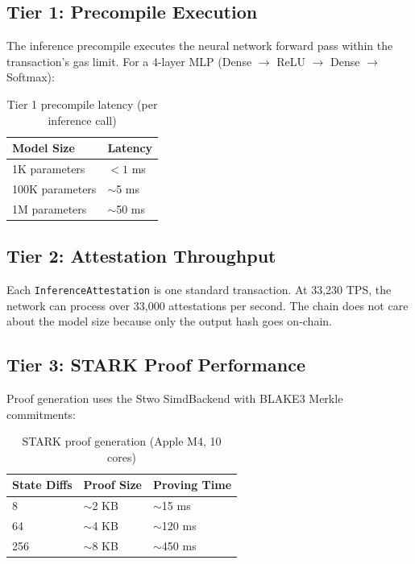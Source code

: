 \documentclass[conference]{IEEEtran}
\begin{document}
\subsection{Tier 1: Precompile Execution}

The inference precompile executes the neural network forward pass within the transaction's gas limit. For a 4-layer MLP (Dense $\rightarrow$ ReLU $\rightarrow$ Dense $\rightarrow$ Softmax):

\begin{table}[h]
\caption{Tier 1 precompile latency (per inference call)}
\centering
\begin{tabular}{ll}
\toprule
Model Size & Latency \\
\midrule
1K parameters & $< 1$ ms \\
100K parameters & $\sim$5 ms \\
1M parameters & $\sim$50 ms \\
\bottomrule
\end{tabular}
\end{table}

\subsection{Tier 2: Attestation Throughput}

Each \texttt{InferenceAttestation} is one standard transaction. At 33,230 TPS, the network can process over 33,000 attestations per second. The chain does not care about the model size because only the output hash goes on-chain.

\subsection{Tier 3: STARK Proof Performance}

Proof generation uses the Stwo SimdBackend with BLAKE3 Merkle commitments:

\begin{table}[h]
\caption{STARK proof generation (Apple M4, 10 cores)}
\centering
\begin{tabular}{lll}
\toprule
State Diffs & Proof Size & Proving Time \\
\midrule
8 & $\sim$2 KB & $\sim$15 ms \\
64 & $\sim$4 KB & $\sim$120 ms \\
256 & $\sim$8 KB & $\sim$450 ms \\
\bottomrule
\end{tabular}
\end{table}
\end{document}
